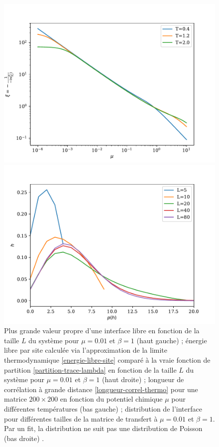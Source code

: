 \begin{figure}
\begin{minipage}[t]{0.4\linewidth}
	\end{minipage}
	\begin{minipage}{0.4\linewidth}
    	\includegraphics[width=\linewidth]{chap4/longueur-correl.pdf}
	\end{minipage}
	\begin{minipage}{0.4\linewidth}
    	\includegraphics[width=\linewidth]{chap4/distribution-taille-finie.pdf}
	\end{minipage}	
	\caption{Plus grande valeur propre d'une interface libre en fonction de la taille $L$ du système pour $\mu = 0.01$ et $\beta = 1$ (haut gauche)  ; énergie libre par site calculée via l'approximation de la limite thermodynamique \ref{energie-libre-site} comparé à la vraie fonction de partition \ref{partition-trace-lambda} en fonction de la taille $L$ du système pour $\mu=0.01$ et $\beta = 1$ (haut droite) ; longueur de corrélation à grande distance \ref{longueur-correl-thermo} pour une matrice $200\times200$ en fonction du potentiel chimique $\mu$ pour différentes températures (bas gauche) ; distribution de l'interface pour différentes tailles de la matrice de transfert à $\mu=0.01$ et $\beta = 1$. Par un fit, la distribution ne suit pas une distribution de Poisson (bas droite) .}
	\vspace{-0.5cm}
\end{figure}  



